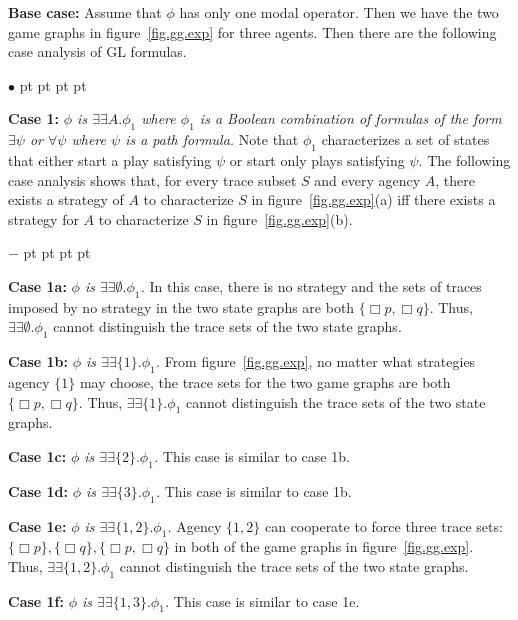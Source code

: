 \documentclass[11pt]{article}
\newcommand{\existsb}{\mbox{$\exists\!\!\exists$}}
\newcommand{\pfrr}{\Box}
\newenvironment{list1}{\begin{list}{$\bullet$}
{\topsep 0 pt \parsep 0 pt \partopsep 0 pt \itemsep 0 pt}}{\end{list}}
\newenvironment{list2}{\begin{list}{$-$}
{\topsep 0 pt \parsep 0 pt \partopsep 0 pt \itemsep 0 pt}}{\end{list}}
\begin{document}
\noindent 
{\bf Base case:} Assume that $\phi$ has only one modal operator.
Then we have the two game graphs in figure~\ref{fig.gg.exp}
for three agents.
Then there are the following case analysis of GL formulas.
\begin{list1}
\item {\bf Case 1:} {\em $\phi$ is $\existsb  A.\phi_1$
    where $\phi_1$ is a Boolean combination of
    formulas of the form $\exists \psi$ or $\forall \psi$
    where $\psi$ is a path formula.}
    Note that $\phi_1$ characterizes a set of states that 
    either start a play satisfying $\psi$ or 
    start only plays satisfying $\psi$.
    The following case analysis shows that, for every
    trace subset $S$ and every agency $A$,
    there exists a strategy of $A$ to characterize
    $S$ in figure~\ref{fig.gg.exp}(a) iff
    there exists a strategy for $A$ to characterize
    $S$ in figure~\ref{fig.gg.exp}(b).
    \begin{list2}
    \item {\bf Case 1a:} {\em $\phi$ is $\existsb\emptyset.\phi_1$.}
        In this case, there is no strategy and the sets of traces
        imposed by no strategy in the two state graphs are
        both $\{\pfrr p,\pfrr q\}$.
        Thus, $\existsb\emptyset.\phi_1$ cannot distinguish the trace sets of the
        two state graphs.
    \item {\bf Case 1b:} {\em $\phi$ is $\existsb\{1\}.\phi_1$.}
        From figure~\ref{fig.gg.exp}, no matter what strategies
        agency $\{1\}$ may choose, the
        trace sets for the two game graphs are both
        $\{\pfrr p,\pfrr q\}$.
        Thus, $\existsb\{1\}.\phi_1$ cannot distinguish the trace sets of the
        two state graphs.
    \item {\bf Case 1c:} {\em $\phi$ is
        $\existsb\{2\}.\phi_1$.}
        This case is similar to case 1b.
    \item {\bf Case 1d:} {\em $\phi$ is
        $\existsb\{3\}.\phi_1$.}
        This case is similar to case 1b.
    \item {\bf Case 1e:} {\em $\phi$ is
        $\existsb\{1,2\}.\phi_1$.}
        Agency $\{1, 2\}$ can cooperate to force three trace sets:
        $\{\pfrr p\}, \{\pfrr q\}, \{\pfrr p,\pfrr q\}$
        in both of the game graphs in figure~\ref{fig.gg.exp}.
        Thus, $\existsb\{1,2\}.\phi_1$ cannot distinguish the trace sets of the
        two state graphs.
    \item {\bf Case 1f:} {\em $\phi$ is
        $\existsb\{1,3\}.\phi_1$.}
        This case is similar to case 1e.

\end{list2}
\end{list1}
\end{document}
